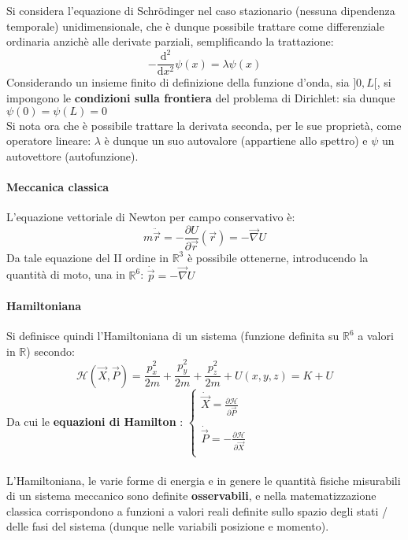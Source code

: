 \documentclass[10pt]{article}
\theoremstyle{plain}
\begin{document}
Si considera l'equazione di Schr\"odinger nel caso stazionario (nessuna dipendenza temporale) unidimensionale, che è dunque possibile trattare come differenziale ordinaria anzichè alle derivate parziali, semplificando la trattazione:
\[- \frac{\textrm{d}^2}{\textrm{d}x^2}\psi(x) = \lambda \psi(x)\]
Considerando un insieme finito di definizione della funzione d'onda, sia $]0, L[$, si impongono le \textbf{condizioni sulla frontiera} del problema di Dirichlet: sia dunque $\psi(0) = \psi(L) = 0$
\\Si nota ora che è possibile trattare la derivata seconda, per le sue proprietà, come operatore lineare: $\lambda$ è dunque un suo autovalore (appartiene allo spettro) e $\psi$ un autovettore (autofunzione).

\paragraph*{Meccanica classica}
L'equazione vettoriale di Newton per campo conservativo è:
\[m \ddot{\Vec{r}} = - \frac{\partial U}{\partial \Vec{r}}(\Vec{r}) = - \Vec{\nabla} U\]
Da tale equazione del II ordine in $\mathbb{R}^3$ è possibile ottenerne, introducendo la quantità di moto, una in $\mathbb{R}^6$: $\displaystyle \dot{\Vec{p}} = - \Vec{\nabla} U$

\paragraph*{Hamiltoniana}
Si definisce quindi l'Hamiltoniana di un sistema (funzione definita su $\mathbb{R}^6$ a valori in $\mathbb{R}$) secondo:
\[\mathcal{H} (\Vec{X}, \Vec{P}) = \frac{p_x^2}{2m} +  \frac{p_y^2}{2m} +  \frac{p_z^2}{2m} + U(x,y,z) = K + U\]
Da cui le \textbf{equazioni di Hamilton} : $\displaystyle \begin{cases}
\displaystyle \dot{\Vec{X}} = \frac{\partial \mathcal{H}}{\partial \Vec{P}}\\
\\
   \displaystyle \dot{\Vec{P}} = - \frac{\partial \mathcal{H}}{\partial \Vec{X}}\\ 
\end{cases}$
\\~\\L'Hamiltoniana, le varie forme di energia e in genere le quantità fisiche misurabili di un sistema meccanico sono definite \textbf{osservabili}, e nella matematizzazione classica corrispondono a funzioni a valori reali definite sullo spazio degli stati / delle fasi del sistema (dunque nelle variabili posizione e momento).
\end{document}
